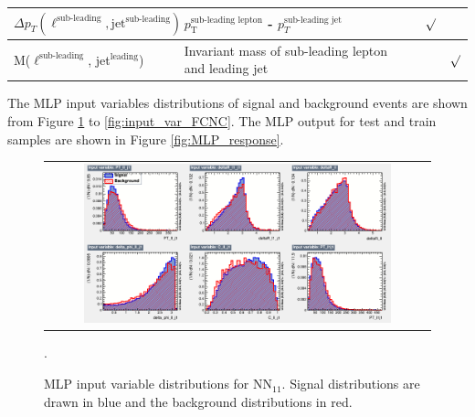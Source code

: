 \begin{table}[h]
{\begin{tabular}{|l|l|c|c|c|}
$\Delta p_{T}(\ell^{\text{sub-leading}}, \text{jet}^{\text{sub-leading}})$ & $p_{\text{T}}^{\text{sub-leading lepton}}$ - $p_{T}^{\text{sub-leading jet}}$    &              & $\surd$      &\\ \hline
M($\ell^{\text{sub-leading}}$, jet$^{\text{leading}}$)               & Invariant mass of sub-leading lepton and leading jet                                   &                          && $\surd$      \\  \hline
\end{tabular}}
\end{table}

The MLP input variables distributions of signal and background events are shown from Figure \ref{fig:input_var_1j1b} to \ref{fig:input_var_FCNC}. The MLP output for test and train samples are shown in Figure \ref{fig:MLP_response}.

\begin{figure}[ht]
  \begin{center}
    \begin{tabular}{c}
      \includegraphics[width=0.82\textwidth]{figures/tW/fig/MVA/MLP_1j1b/var_1.png}\\
    \end{tabular}
    \caption{MLP input variable distributions for NN$_{11}$. Signal distributions are drawn in blue and the background distributions in red.}.
    \label{fig:input_var_1j1b}
  \end{center}
\end{figure}

